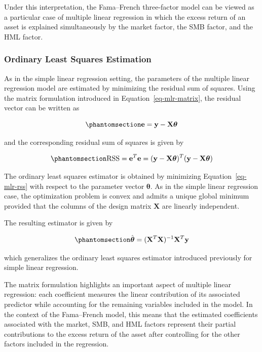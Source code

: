 \documentclass[
  12pt,
  letterpaper,
]{book}
\begin{document}
Under this interpretation, the Fama--French three-factor model can be
viewed as a particular case of multiple linear regression in which the
excess return of an asset is explained simultaneously by the market
factor, the SMB factor, and the HML factor.

\subsubsection{Ordinary Least Squares
Estimation}\label{ordinary-least-squares-estimation-1}

As in the simple linear regression setting, the parameters of the
multiple linear regression model are estimated by minimizing the
residual sum of squares. Using the matrix formulation introduced in
Equation~\ref{eq-mlr-matrix}, the residual vector can be written as

\begin{equation}\phantomsection\label{eq-mlr-residuals}{
\mathbf{e}
=
\mathbf{y}
-
\mathbf{X}\boldsymbol{\theta}
}\end{equation}

and the corresponding residual sum of squares is given by

\begin{equation}\phantomsection\label{eq-mlr-rss}{
\mathrm{RSS}
=
\mathbf{e}^T\mathbf{e}
=
(\mathbf{y} - \mathbf{X}\boldsymbol{\theta})^T
(\mathbf{y} - \mathbf{X}\boldsymbol{\theta})
}\end{equation}

The ordinary least squares estimator is obtained by minimizing
Equation~\ref{eq-mlr-rss} with respect to the parameter vector
\(\boldsymbol{\theta}\). As in the simple linear regression case, the
optimization problem is convex and admits a unique global minimum
provided that the columns of the design matrix \(\mathbf{X}\) are
linearly independent.

The resulting estimator is given by

\begin{equation}\phantomsection\label{eq-mlr-ols}{
\hat{\boldsymbol{\theta}}
=
(\mathbf{X}^T\mathbf{X})^{-1}
\mathbf{X}^T
\mathbf{y}
}\end{equation}

which generalizes the ordinary least squares estimator introduced
previously for simple linear regression.

The matrix formulation highlights an important aspect of multiple linear
regression: each coefficient measures the linear contribution of its
associated predictor while accounting for the remaining variables
included in the model. In the context of the Fama--French model, this
means that the estimated coefficients associated with the market, SMB,
and HML factors represent their partial contributions to the excess
return of the asset after controlling for the other factors included in
the regression.
\end{document}
